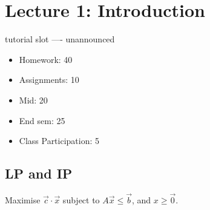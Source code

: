 \chapter{Lecture 1: Introduction}
tutorial slot ---- unannounced

\begin{itemize}
\item Homework: 40%
\item Assignments: 10%
\item Mid: 20%
\item End sem: 25%
\item Class Participation: 5%
\end{itemize}


\section{LP and IP}
Maximise $\vec c \cdot \vec x $ subject to $A \vec x \leq \vec b$, and 
$x \geq \vec 0$.



